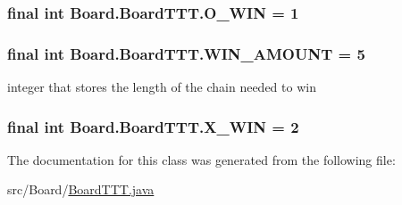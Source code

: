 \subsubsection[{O\+\_\+\+W\+I\+N}]{\setlength{\rightskip}{0pt plus 5cm}final int Board.\+Board\+T\+T\+T.\+O\+\_\+\+W\+I\+N = 1\hspace{0.3cm}{\ttfamily [static]}}\label{class_board_1_1_board_t_t_t_a989aacd76a6193fe54a4500dd8151b41}
\hypertarget{class_board_1_1_board_t_t_t_ab11d997e2ea0983b566f23c4685767f6}{}
\subsubsection[{W\+I\+N\+\_\+\+A\+M\+O\+U\+N\+T}]{\setlength{\rightskip}{0pt plus 5cm}final int Board.\+Board\+T\+T\+T.\+W\+I\+N\+\_\+\+A\+M\+O\+U\+N\+T = 5\hspace{0.3cm}{\ttfamily [private]}}\label{class_board_1_1_board_t_t_t_ab11d997e2ea0983b566f23c4685767f6}
integer that stores the length of the chain needed to win \hypertarget{class_board_1_1_board_t_t_t_ab77ee706643fb1825e78f6b8dcacc021}{}
\subsubsection[{X\+\_\+\+W\+I\+N}]{\setlength{\rightskip}{0pt plus 5cm}final int Board.\+Board\+T\+T\+T.\+X\+\_\+\+W\+I\+N = 2\hspace{0.3cm}{\ttfamily [static]}}\label{class_board_1_1_board_t_t_t_ab77ee706643fb1825e78f6b8dcacc021}


The documentation for this class was generated from the following file\+:\begin{DoxyCompactItemize}
\item 
src/\+Board/\hyperlink{_board_t_t_t_8java}{Board\+T\+T\+T.\+java}\end{DoxyCompactItemize}

